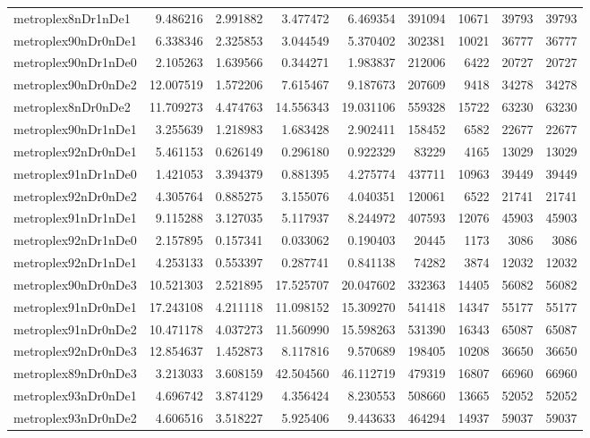 \begin{longtable}{|l|r|r|r|r|r|r|r|r|}
metroplex8nDr1nDe1 & 9.486216 & 2.991882 & 3.477472 & 6.469354 & 391094 & 10671 & 39793 & 39793 \\
metroplex90nDr0nDe1 & 6.338346 & 2.325853 & 3.044549 & 5.370402 & 302381 & 10021 & 36777 & 36777 \\
metroplex90nDr1nDe0 & 2.105263 & 1.639566 & 0.344271 & 1.983837 & 212006 & 6422 & 20727 & 20727 \\
metroplex90nDr0nDe2 & 12.007519 & 1.572206 & 7.615467 & 9.187673 & 207609 & 9418 & 34278 & 34278 \\
metroplex8nDr0nDe2 & 11.709273 & 4.474763 & 14.556343 & 19.031106 & 559328 & 15722 & 63230 & 63230 \\
metroplex90nDr1nDe1 & 3.255639 & 1.218983 & 1.683428 & 2.902411 & 158452 & 6582 & 22677 & 22677 \\
metroplex92nDr0nDe1 & 5.461153 & 0.626149 & 0.296180 & 0.922329 & 83229 & 4165 & 13029 & 13029 \\
metroplex91nDr1nDe0 & 1.421053 & 3.394379 & 0.881395 & 4.275774 & 437711 & 10963 & 39449 & 39449 \\
metroplex92nDr0nDe2 & 4.305764 & 0.885275 & 3.155076 & 4.040351 & 120061 & 6522 & 21741 & 21741 \\
metroplex91nDr1nDe1 & 9.115288 & 3.127035 & 5.117937 & 8.244972 & 407593 & 12076 & 45903 & 45903 \\
metroplex92nDr1nDe0 & 2.157895 & 0.157341 & 0.033062 & 0.190403 & 20445 & 1173 & 3086 & 3086 \\
metroplex92nDr1nDe1 & 4.253133 & 0.553397 & 0.287741 & 0.841138 & 74282 & 3874 & 12032 & 12032 \\
metroplex90nDr0nDe3 & 10.521303 & 2.521895 & 17.525707 & 20.047602 & 332363 & 14405 & 56082 & 56082 \\
metroplex91nDr0nDe1 & 17.243108 & 4.211118 & 11.098152 & 15.309270 & 541418 & 14347 & 55177 & 55177 \\
metroplex91nDr0nDe2 & 10.471178 & 4.037273 & 11.560990 & 15.598263 & 531390 & 16343 & 65087 & 65087 \\
metroplex92nDr0nDe3 & 12.854637 & 1.452873 & 8.117816 & 9.570689 & 198405 & 10208 & 36650 & 36650 \\
metroplex89nDr0nDe3 & 3.213033 & 3.608159 & 42.504560 & 46.112719 & 479319 & 16807 & 66960 & 66960 \\
metroplex93nDr0nDe1 & 4.696742 & 3.874129 & 4.356424 & 8.230553 & 508660 & 13665 & 52052 & 52052 \\
metroplex93nDr0nDe2 & 4.606516 & 3.518227 & 5.925406 & 9.443633 & 464294 & 14937 & 59037 & 59037 \\

\end{longtable}
